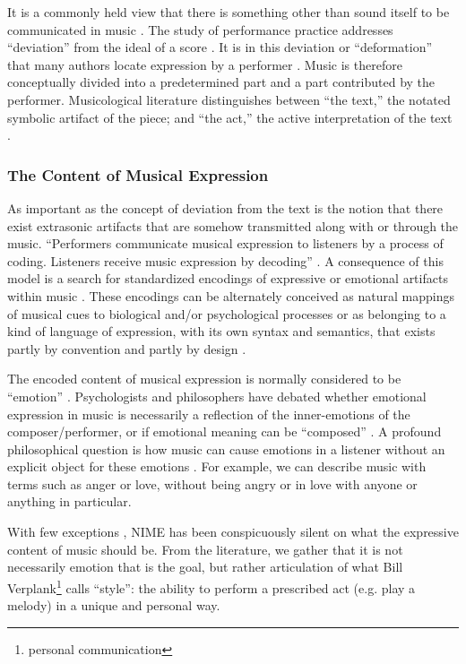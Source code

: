 It is a commonly held view that there is something other than sound itself to be communicated in music \cite{Dobrian:2006,Marrin:2000,Poepel:2005}. The study of performance practice addresses ``deviation'' from the ideal of a score \cite{Mayer-Brown:}. It is in this deviation or ``deformation'' that many authors locate expression by a performer \cite{Muller:2003,Sundberg:1988}. Music is therefore conceptually divided into a predetermined part and a part contributed by the performer. Musicological literature distinguishes between ``the text,'' the notated symbolic artifact of the piece; and ``the act,'' the active interpretation of the text \cite{Taruskin:1995}.

\subsubsection{The Content of Musical Expression}
\label{Gurevich:subsub:1_1_1}
As important as the concept of deviation from the text is the notion that there exist extrasonic artifacts that are somehow transmitted along with or through the music. ``Performers communicate musical expression to listeners by a process of coding. Listeners receive music expression by decoding'' \cite{Poepel:2005}. A consequence of this model is a search for standardized encodings of expressive or emotional artifacts within music \cite{Juslin:2007,Scherer:2001}. These encodings can be alternately conceived as natural mappings of musical cues to biological and/or psychological processes \cite{Peretz:2001} or as belonging to a kind of language of expression, with its own syntax and semantics, that exists partly by convention and partly by design \cite{Sloboda:1992}.

The encoded content of musical expression is normally considered to be ``emotion'' \cite{Poepel:2005}. Psychologists and philosophers have debated whether emotional expression in music is necessarily a reflection of the inner-emotions of the composer/performer, or if emotional meaning can be ``composed'' \cite{Davies:1994}. A profound philosophical question is how music can cause emotions in a listener without an explicit object for these emotions \cite{Davies:2001}. For example, we can describe music with terms such as anger or love, without being angry or in love with anyone or anything in particular.

With few exceptions \cite{Poepel:2005}, NIME has been conspicuously silent on what the expressive content of music should be. From the literature, we gather that it is not necessarily emotion that is the goal, but rather articulation of what Bill Verplank\footnote{personal communication} calls ``style'': the ability to perform a prescribed act (e.g. play a melody) in a unique and personal way.

